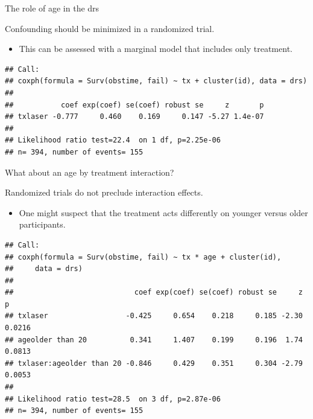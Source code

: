 \documentclass[ignorenonframetext,]{beamer}
\providecommand{\tightlist}{%
  \setlength{\itemsep}{0pt}\setlength{\parskip}{0pt}}
\begin{document}
\begin{frame}[fragile]{%
\protect\hypertarget{the-role-of-age-in-the-drs}{%
The role of age in the drs}}

Confounding should be minimized in a randomized trial.

\begin{itemize}
\tightlist
\item
  This can be assessed with a marginal model that includes only
  treatment.
\end{itemize}

\scriptsize

\begin{verbatim}
## Call:
## coxph(formula = Surv(obstime, fail) ~ tx + cluster(id), data = drs)
## 
##           coef exp(coef) se(coef) robust se     z       p
## txlaser -0.777     0.460    0.169     0.147 -5.27 1.4e-07
## 
## Likelihood ratio test=22.4  on 1 df, p=2.25e-06
## n= 394, number of events= 155
\end{verbatim}

\end{frame}

\begin{frame}[fragile]{%
\protect\hypertarget{what-about-an-age-by-treatment-interaction}{%
What about an age by treatment interaction?}}

Randomized trials do not preclude interaction effects.

\begin{itemize}
\tightlist
\item
  One might suspect that the treatment acts differently on younger
  versus older participants.
\end{itemize}

\scriptsize

\begin{verbatim}
## Call:
## coxph(formula = Surv(obstime, fail) ~ tx * age + cluster(id), 
##     data = drs)
## 
##                            coef exp(coef) se(coef) robust se     z      p
## txlaser                  -0.425     0.654    0.218     0.185 -2.30 0.0216
## ageolder than 20          0.341     1.407    0.199     0.196  1.74 0.0813
## txlaser:ageolder than 20 -0.846     0.429    0.351     0.304 -2.79 0.0053
## 
## Likelihood ratio test=28.5  on 3 df, p=2.87e-06
## n= 394, number of events= 155
\end{verbatim}

\end{frame}
\end{document}
